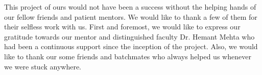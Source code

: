 
This project of ours would not have been a success without the helping hands of our fellow friends and patient mentors. We would like to thank a few of them for their selfless work with us. First and foremost, we would like to express our gratitude towards our mentor and distinguished faculty Dr. Hemant Mehta  who had been a continuous support since the inception of the project. Also, we would like to thank our some friends and batchmates who always helped us whenever we were stuck anywhere. 
